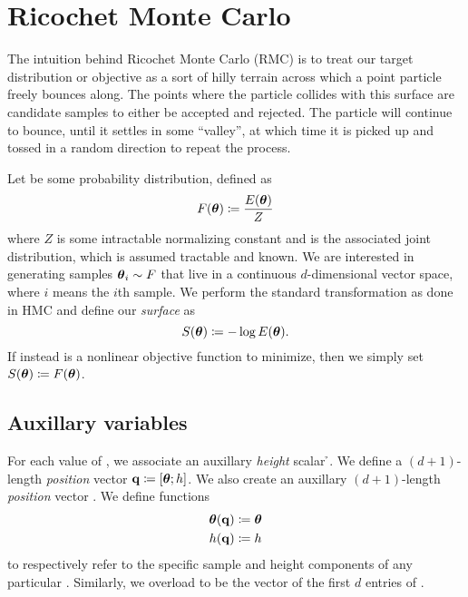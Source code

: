 \section{Ricochet Monte Carlo} \label{s:rmc}

The intuition behind Ricochet Monte Carlo (RMC) is to treat our target
distribution or objective as a sort of hilly terrain across which a point
particle freely bounces along. The points where the particle collides with this
surface are candidate samples to either be accepted and rejected. The particle
will continue to bounce, until it settles in some ``valley'', at which time it is
picked up and tossed in a random direction to repeat the process.

Let \target{} be some probability distribution, defined as
\begin{equation*}
    F(\boldsymbol{\theta}){} \coloneqq \frac{E(\boldsymbol{\theta}){}}{Z}
\end{equation*}
where $Z$ is some intractable normalizing constant and \energy{} is the
associated joint distribution, which is assumed tractable and known. We are
interested in generating samples $\boldsymbol{\theta}_i{} \sim F$ that live in a continuous
$d$-dimensional vector space, where $i$ means the $i$th sample. We perform the
standard transformation as done in HMC and define our \emph{surface} as
\begin{equation*}
    \label{eq:surface}
    S(\boldsymbol{\theta}){} \coloneqq - \log E(\boldsymbol{\theta}){}.
\end{equation*}
If instead \target{} is a nonlinear objective function to minimize, then we
simply set $S(\boldsymbol{\theta}){} \coloneqq F(\boldsymbol{\theta}){}$.

\subsection{Auxillary variables} \label{ss:auxillary}

For each value of \thetab{}, we associate an auxillary \emph{height} scalar
\h{}. We define a $(d+1)$-length \emph{position} vector $\mathbf{q}{} \coloneqq
[\boldsymbol{\theta}{}; h{}]$. We also create an auxillary $(d+1)$-length \emph{position}
vector \p{}. We define functions
\begin{align*}
    \boldsymbol{\theta}(\mathbf{q}{}) &\coloneqq  \boldsymbol{\theta}{} \\
    h(\mathbf{q}{})     &\coloneqq  h{}
\end{align*}
to respectively refer to the specific sample and height components of any
particular \q{}. Similarly, we overload \thetaof{\p{}} to be the vector of the
first $d$ entries of \p{}.

